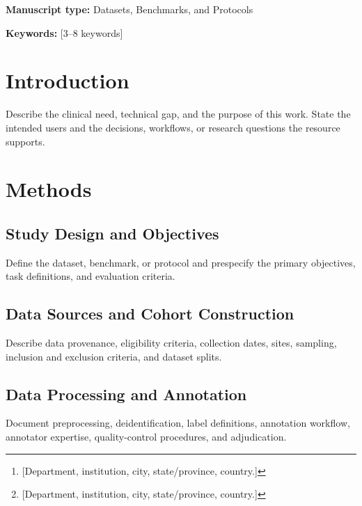 \documentclass[11pt]{article}
\title{\ManuscriptTitle}
\author{
  [First Author, Degree]\thanks{[Department, institution, city, state/province, country.]} \
  \and
  [Second Author, Degree]\thanks{[Department, institution, city, state/province, country.]} \\
  \texttt{Correspondence: \CorrespondingAuthor; \CorrespondingEmail}
}
\date{}
\newcommand{\ManuscriptType}{Datasets, Benchmarks, and Protocols}
\begin{document}
\maketitle

\noindent\textbf{Manuscript type:} \ManuscriptType

\begin{abstract}
	\textbf{Background:} [State the clinical or methodological problem.]\\
	\textbf{Methods:} [Describe the dataset, benchmark, protocol, cohorts, data sources, task definition, and evaluation approach.]\\
	\textbf{Results:} [Summarize dataset scale, baseline performance, key findings, and availability.]\\
	\textbf{Conclusions:} [State the principal contribution and intended use.]
\end{abstract}

\noindent\textbf{Keywords:} [3--8 keywords]

\section{Introduction}
Describe the clinical need, technical gap, and the purpose of this work. State the intended users and the decisions, workflows, or research questions the resource supports.

\section{Methods}

\subsection{Study Design and Objectives}
Define the dataset, benchmark, or protocol and prespecify the primary objectives, task definitions, and evaluation criteria.

\subsection{Data Sources and Cohort Construction}
Describe data provenance, eligibility criteria, collection dates, sites, sampling, inclusion and exclusion criteria, and dataset splits.

\subsection{Data Processing and Annotation}
Document preprocessing, deidentification, label definitions, annotation workflow, annotator expertise, quality-control procedures, and adjudication.
\end{document}

